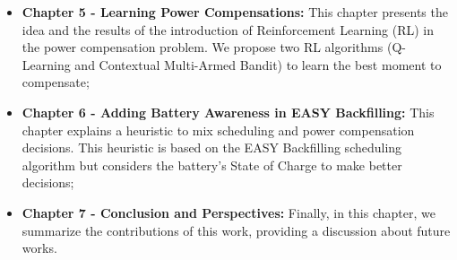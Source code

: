 \begin{itemize}
    \item[] \textbf{Chapter 5 - Learning Power Compensations:} This chapter presents the idea and the results of the introduction of Reinforcement Learning (RL) in the power compensation problem. We propose two RL algorithms (Q-Learning and Contextual Multi-Armed Bandit) to learn the best moment to compensate;
    \item[] \textbf{Chapter 6 - Adding Battery Awareness in EASY Backfilling:} This chapter explains a heuristic to mix scheduling and power compensation decisions. This heuristic is based on the EASY Backfilling scheduling algorithm but considers the battery's State of Charge to make better decisions;
    \item[] \textbf{Chapter 7 - Conclusion and Perspectives:} Finally, in this chapter, we summarize the contributions of this work, providing a discussion about future works.
\end{itemize}
